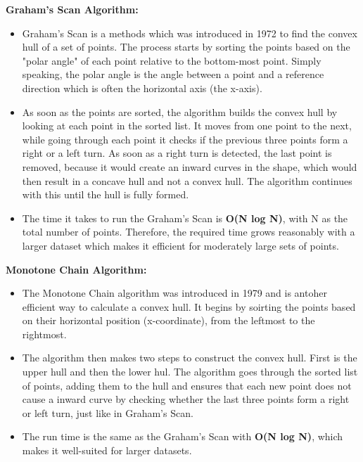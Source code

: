     \textbf{Graham's Scan Algorithm:} 
    \begin{itemize}
        \item Graham's Scan is a methods which was introduced in 1972 to find the convex hull of a set of points. The process starts by sorting the points based on the "polar angle" of each point relative to the bottom-most point. Simply speaking, the polar angle is the angle between a point and a reference direction which is often the horizontal axis (the x-axis).
        \item As soon as the points are sorted, the algorithm builds the convex hull by looking at each point in the sorted list. It moves from one point to the next, while going through each point it checks if the previous three points form a right or a left turn. As soon as a right turn is detected, the last point is removed, because it would create an inward curves in the shape, which would then result in a concave hull and not a convex hull. The algorithm continues with this until the hull is fully formed.
        \item The time it takes to run the Graham's Scan is \textbf{O(N log N)}, with N as the total number of points. Therefore, the required time grows reasonably with a larger dataset which makes it efficient for moderately large sets of points.
    \end{itemize} 
    \blankLine 
    \textbf{Monotone Chain Algorithm:}
    \begin{itemize}
        \item The Monotone Chain algorithm was introduced in 1979 and is antoher efficient way to calculate a convex hull. It begins by soirting the points based on their horizontal position (x-coordinate), from the leftmost to the rightmost.
        \item The algorithm then makes two steps to construct the convex hull. First is the upper hull and then the lower hul. The algorithm goes through the sorted list of points, adding them to the hull and ensures that each new point does not cause a inward curve by checking whether the last three points form a right or left turn, just like in Graham's Scan.
        \item The run time is the same as the Graham's Scan with \textbf{O(N log N)}, which makes it well-suited for larger datasets.
    \end{itemize} \autocite{Andi:typesOfConvexHullAlgos, Andi:convexHullPic}

